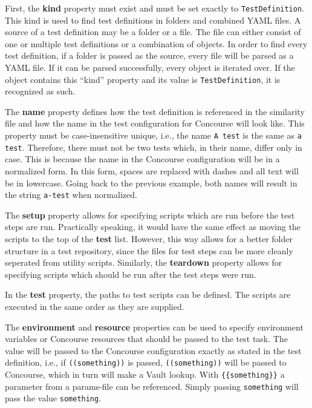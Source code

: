 First, the \textbf{kind} property must exist and must be set exactly to \verb|TestDefinition|.
This kind is used to find test definitions in folders and combined YAML files.
A source of a test definition may be a folder or a file.
The file can either consist of one or multiple test definitions or a combination of objects.
In order to find every test definition, if a folder is passed as the source, every file will be parsed as a YAML file.
If it can be parsed successfully, every object is iterated over.
If the object contains this ``kind'' property and its value is \verb|TestDefinition|, it is recognized as such.

\pagebreak

The \textbf{name} property defines how the test definition is referenced in the similarity file and how the name in the test configuration for Concourse will look like.
This property must be case-insensitive unique, i.e., the name \verb|A test| is the same as \verb|a test|.
Therefore, there must not be two tests which, in their name, differ only in case.
This is because the name in the Concourse configuration will be in a normalized form.
In this form, spaces are replaced with dashes and all text will be in lowercase.
Going back to the previous example, both names will result in the string \verb|a-test| when normalized.

The \textbf{setup} property allows for specifying scripts which are run before the test steps are run.
Practically speaking, it would have the same effect as moving the scripts to the top of the \textbf{test} list.
However, this way allows for a better folder structure in a test repository, since the files for test steps can be more cleanly seperated from utility scripts.
Similarly, the \textbf{teardown} property allows for specifying scripts which should be run after the test steps were run.

In the \textbf{test} property, the paths to test scripts can be defined.
The scripts are executed in the same order as they are supplied.

The \textbf{environment} and \textbf{resource} properties can be used to specify environment variables or Concourse resources that should be passed to the test task.
The value will be passed to the Concourse configuration exactly as stated in the test definition, i.e., if \verb|((something))| is passed, \verb|((something))| will be passed to Concourse, which in turn will make a Vault lookup.
With \verb|{{something}}| a parameter from a params-file can be referenced.
Simply passing \verb|something| will pass the value \verb|something|.

